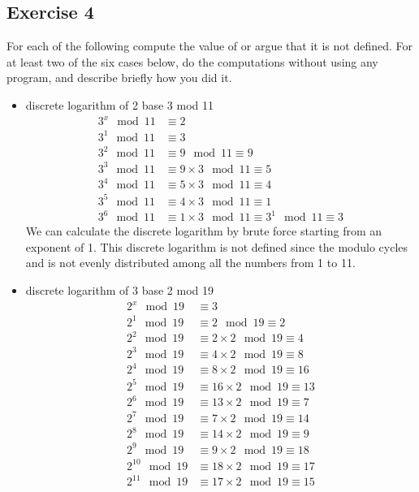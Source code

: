 \documentclass{math}
\begin{document}
\subsection*{Exercise 4}
For each of the following compute the value of or argue that it is not defined.
For at least two of the six cases below, do the computations without using any
program, and describe briefly how you did it.
\begin{itemize}
  \item discrete logarithm of 2 base 3 mod 11
  \begin{align*}
    3^x\mod11 &\equiv 2 \\
    3^1\mod11 &\equiv 3 \\
    3^2\mod11 &\equiv 9\mod11 \equiv 9 \\
    3^3\mod11 &\equiv 9\times3\mod11 \equiv 5 \\
    3^4\mod11 &\equiv 5\times3\mod11 \equiv 4 \\
    3^5\mod11 &\equiv 4\times3\mod11 \equiv 1 \\
    3^6\mod11 &\equiv 1\times3\mod11 \equiv 3^1\mod11 \equiv 3
  \end{align*}
  We can calculate the discrete logarithm by brute force starting from an
  exponent of 1. This discrete logarithm is not defined since the modulo cycles
  and is not evenly distributed among all the numbers from 1 to 11.
  \item discrete logarithm of 3 base 2 mod 19
  \begin{align*}
    2^x\mod19 &\equiv 3 \\
    2^1\mod19 &\equiv 2\mod19 \equiv 2 \\
    2^2\mod19 &\equiv 2\times2\mod19 \equiv 4 \\
    2^3\mod19 &\equiv 4\times2\mod19 \equiv 8 \\
    2^4\mod19 &\equiv 8\times2\mod19 \equiv 16 \\
    2^5\mod19 &\equiv 16\times2\mod19 \equiv 13 \\
    2^6\mod19 &\equiv 13\times2\mod19 \equiv 7 \\
    2^7\mod19 &\equiv 7\times2\mod19 \equiv 14 \\
    2^8\mod19 &\equiv 14\times2\mod19 \equiv 9 \\
    2^9\mod19 &\equiv 9\times2\mod19 \equiv 18 \\
    2^{10}\mod19 &\equiv 18\times2\mod19 \equiv 17 \\
    2^{11}\mod19 &\equiv 17\times2\mod19 \equiv 15 \\

\end{align*}
\end{itemize}
\end{document}
